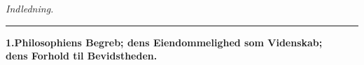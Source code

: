 \documentclass[12pt,a4paper]{book}
\newcommand{\divrule}{\begin{center}\rule{2cm}{0.4pt}\end{center}}
\begin{document}
%
\begin{center}
{\Large\emph{Indledning.}}
\end{center}
\divrule
\begin{center}
\textbf{1.\enspace Philosophiens Begreb; dens Eiendommelighed som Videnskab;\\
dens Forhold til Bevidstheden.}
\end{center}
\end{document}
